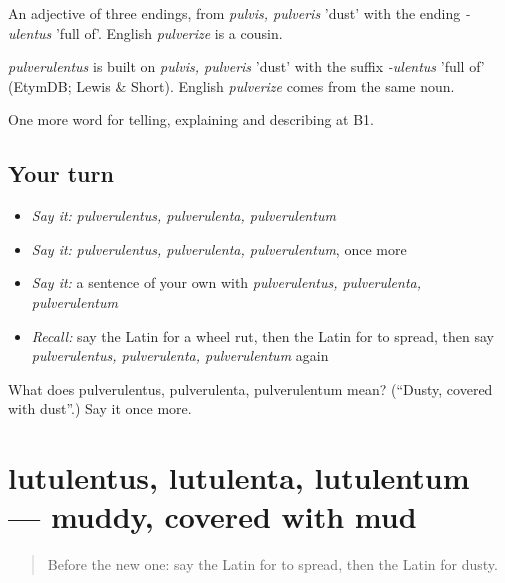 An adjective of three endings, from \emph{pulvis, pulveris} 'dust' with the ending \emph{-ulentus} 'full of'. English \emph{pulverize} is a cousin.

\begin{cousinweb}
\emph{pulverulentus} is built on \emph{pulvis, pulveris} 'dust' with the suffix \emph{-ulentus} 'full of' (EtymDB; Lewis \& Short). English \emph{pulverize} comes from the same noun.
\end{cousinweb}

\begin{grammarlens}[title={What you've built}]
One more word for telling, explaining and describing at B1.
\end{grammarlens}

\subsection*{Your turn}
\begin{itemize}
\raggedright
  \item \emph{Say it:} \emph{pulverulentus, pulverulenta, pulverulentum}
  \item \emph{Say it:} \emph{pulverulentus, pulverulenta, pulverulentum}, once more
  \item \emph{Say it:} a sentence of your own with \emph{pulverulentus, pulverulenta, pulverulentum}
  \item \emph{Recall:} say the Latin for a wheel rut, then the Latin for to spread, then say \emph{pulverulentus, pulverulenta, pulverulentum} again
\end{itemize}

\begin{tcolorbox}[breakable,colback=teal!4,colframe=teal!35!black,title={Before you move on}]
What does pulverulentus, pulverulenta, pulverulentum mean? (\textquotedblleft{}Dusty, covered with dust\textquotedblright{}.) Say it once more.
\end{tcolorbox}
\section[lutulentus, lutulenta, lutulentum]{lutulentus, lutulenta, lutulentum — muddy, covered with mud}

\label{lesson:LA-C426-lutulentus}



\begin{quote}
Before the new one: say the Latin for to spread, then the Latin for dusty.
\end{quote}

